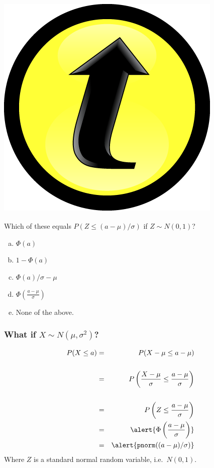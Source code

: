 \documentclass[handout]{beamer}
\begin{document}
\begin{frame}
\frametitle{\includegraphics[scale = 0.05]{./images/clicker}}
Which of these equals $P\left(Z \leq (a-\mu)/\sigma\right)$ if $Z\sim N(0,1)$?
	\begin{enumerate}[(a)]
		\item $\Phi(a)$
		\item $1 - \Phi(a)$
		\item $\Phi(a)/\sigma - \mu$
		\item $\Phi\left(\frac{a - \mu}{\sigma}  \right)$
		\item None of the above.
	\end{enumerate}
\end{frame}

\begin{frame}
\frametitle{What if $X \sim N(\mu, \sigma^2)$?}
\begin{eqnarray*}
	P(X \leq a) &=&\ P(X - \mu \leq a - \mu)\\\\
		&=& P\left( \frac{X-\mu}{\sigma} \leq \frac{a - \mu}{\sigma} \right)\\\\
		&=& P\left(Z \leq  \frac{a - \mu}{\sigma}\right)\\
		&=&\alert{\Phi\left(\frac{a - \mu}{\sigma}  \right)}\\
		&=&\alert{ \mbox{\texttt{pnorm}}((a-\mu)/\sigma)}
\end{eqnarray*}
Where $Z$ is a standard normal random variable, i.e.\ $N(0,1)$.
\end{frame}
\end{document}
